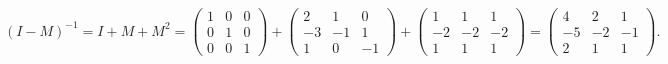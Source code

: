 {\begin{enumerate}
{$$(I-M)^{-1}=I+M+M^2=\left(
\begin{array}{ccc}
1&0&0\\
0&1&0\\
0&0&1
\end{array}
\right)+\left(
\begin{array}{ccc}
2&1&0\\
-3&-1&1\\
1&0&-1
\end{array}
\right)+\left(
\begin{array}{ccc}
1&1&1\\
-2&-2&-2\\
1&1&1
\end{array}
\right)=\left(
\begin{array}{ccc}
4&2&1\\
-5&-2&-1\\
2&1&1
\end{array}
\right).$$}
\end{enumerate}
}
